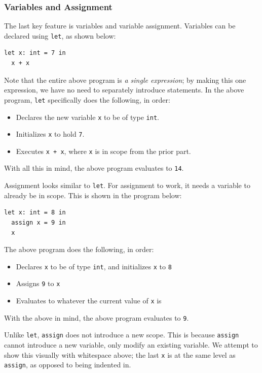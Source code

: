 \subsubsection{Variables and Assignment}
The last key feature is variables and variable assignment.
Variables can be declared using \texttt{let}, as shown below:
\begin{verbatim}
let x: int = 7 in
  x + x
\end{verbatim}
Note that the entire above program is \emph{a single expression}; by making this one expression, we have no need to separately introduce statements.
In the above program, \texttt{let} specifically does the following, in order:
\begin{itemize}
\item Declares the new variable \texttt{x} to be of type \texttt{int}.
\item Initializes \texttt{x} to hold \texttt{7}.
\item Executes \texttt{x + x}, where \texttt{x} is in scope from the prior part.
\end{itemize}
With all this in mind, the above program evaluates to \texttt{14}.

Assignment looks similar to \texttt{let}.
For assignment to work, it needs a variable to already be in scope.
This is shown in the program below:
\begin{verbatim}
let x: int = 8 in
  assign x = 9 in
  x
\end{verbatim}
The above program does the following, in order:
\begin{itemize}
\item Declares \texttt{x} to be of type \texttt{int}, and initializes \texttt{x} to \texttt{8}
\item Assigns \texttt{9} to \texttt{x}
\item Evaluates to whatever the current value of \texttt{x} is
\end{itemize}
With the above in mind, the above program evaluates to \texttt{9}.

Unlike \texttt{let}, \texttt{assign} does not introduce a new scope.
This is because \texttt{assign} cannot introduce a new variable, only modify an existing variable.
We attempt to show this visually with whitespace above; the last \texttt{x} is at the same level as \texttt{assign}, as opposed to being indented in.

